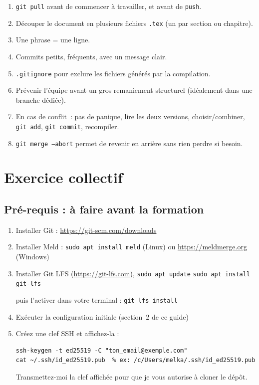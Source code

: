 \documentclass[11pt,a4paper]{article}
\begin{document}
\begin{enumerate}
  \item \texttt{git pull} avant de commencer à travailler, et avant de \texttt{push}.
  \item Découper le document en plusieurs fichiers \texttt{.tex} (un par section ou chapitre).
  \item Une phrase = une ligne.
  \item Commits petits, fréquents, avec un message clair.
  \item \texttt{.gitignore} pour exclure les fichiers générés par la compilation.
  \item Prévenir l'équipe avant un gros remaniement structurel (idéalement dans une branche dédiée).
  \item En cas de conflit~: pas de panique, lire les deux versions, choisir/combiner, \texttt{git add}, \texttt{git commit}, recompiler.
  \item \texttt{git merge --abort} permet de revenir en arrière sans rien perdre si besoin.
\end{enumerate}

\clearpage
\section{Exercice collectif}
\subsection*{Pré-requis : à faire avant la formation}

\begin{enumerate}
	\item Installer Git : \url{https://git-scm.com/downloads}
	\item Installer Meld : \texttt{sudo apt install meld} (Linux) 
	ou \url{https://meldmerge.org} (Windows)
	\item Installer Git LFS (\url{https://git-lfs.com}),  \verb|sudo apt update|
	\verb|sudo apt install git-lfs|
	
	puis l'activer dans votre terminal :
	\texttt{git lfs install}
	\item Exécuter la configuration initiale (section~2 de ce guide)
	
	\item Créez une clef SSH et affichez-la :
	\begin{lstlisting}[style=bashstyle]
ssh-keygen -t ed25519 -C "ton_email@exemple.com"
cat ~/.ssh/id_ed25519.pub  % ex: /c/Users/melka/.ssh/id_ed25519.pub
	\end{lstlisting}
	Transmettez-moi la clef affichée pour que je vous autorise à cloner le dépôt.

\end{enumerate}
\end{document}
